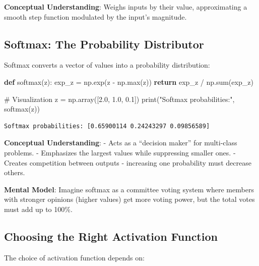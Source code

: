 \documentclass[
  letterpaper,
  DIV=11,
  numbers=noendperiod]{scrreprt}
\newenvironment{Shaded}{\begin{snugshade}}{\end{snugshade}}
\newcommand{\BuiltInTok}[1]{\textcolor[rgb]{0.00,0.23,0.31}{#1}}
\newcommand{\CommentTok}[1]{\textcolor[rgb]{0.37,0.37,0.37}{#1}}
\newcommand{\ControlFlowTok}[1]{\textcolor[rgb]{0.00,0.23,0.31}{\textbf{#1}}}
\newcommand{\FloatTok}[1]{\textcolor[rgb]{0.68,0.00,0.00}{#1}}
\newcommand{\KeywordTok}[1]{\textcolor[rgb]{0.00,0.23,0.31}{\textbf{#1}}}
\newcommand{\NormalTok}[1]{\textcolor[rgb]{0.00,0.23,0.31}{#1}}
\newcommand{\OperatorTok}[1]{\textcolor[rgb]{0.37,0.37,0.37}{#1}}
\newcommand{\StringTok}[1]{\textcolor[rgb]{0.13,0.47,0.30}{#1}}
\begin{document}
\textbf{Conceptual Understanding}: Weighs inputs by their value,
approximating a smooth step function modulated by the input's magnitude.

\subsection{Softmax: The Probability
Distributor}\label{softmax-the-probability-distributor}

Softmax converts a vector of values into a probability distribution:

\begin{Shaded}
\begin{Highlighting}[]
\KeywordTok{def}\NormalTok{ softmax(z):}
\NormalTok{    exp\_z }\OperatorTok{=}\NormalTok{ np.exp(z }\OperatorTok{{-}}\NormalTok{ np.}\BuiltInTok{max}\NormalTok{(z))}
    \ControlFlowTok{return}\NormalTok{ exp\_z }\OperatorTok{/}\NormalTok{ np.}\BuiltInTok{sum}\NormalTok{(exp\_z)}

\CommentTok{\# Visualization}
\NormalTok{z }\OperatorTok{=}\NormalTok{ np.array([}\FloatTok{2.0}\NormalTok{, }\FloatTok{1.0}\NormalTok{, }\FloatTok{0.1}\NormalTok{])}
\BuiltInTok{print}\NormalTok{(}\StringTok{"Softmax probabilities:"}\NormalTok{, softmax(z))}
\end{Highlighting}
\end{Shaded}

\begin{verbatim}
Softmax probabilities: [0.65900114 0.24243297 0.09856589]
\end{verbatim}

\textbf{Conceptual Understanding}: - Acts as a ``decision maker'' for
multi-class problems. - Emphasizes the largest values while suppressing
smaller ones. - Creates competition between outputs - increasing one
probability must decrease others.

\textbf{Mental Model}: Imagine softmax as a committee voting system
where members with stronger opinions (higher values) get more voting
power, but the total votes must add up to 100\%.

\subsection{Choosing the Right Activation
Function}\label{choosing-the-right-activation-function}

The choice of activation function depends on:
\end{document}
